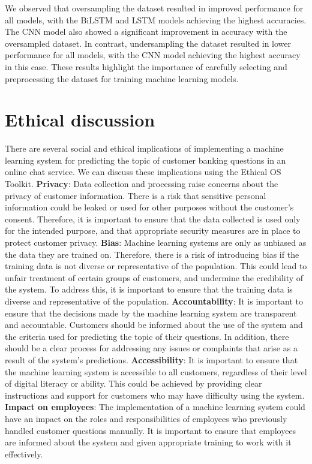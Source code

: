 \documentclass[12pt, a4paper]{article}
\begin{document}
We observed that oversampling the dataset resulted in improved performance for all models, with the BiLSTM and LSTM models achieving the highest accuracies. The CNN model also showed a significant improvement in accuracy with the oversampled dataset. In contrast, undersampling the dataset resulted in lower performance for all models, with the CNN model achieving the highest accuracy in this case. These results highlight the importance of carefully selecting and preprocessing the dataset for training machine learning models.






\section{Ethical discussion}
There are several social and ethical implications of implementing a machine learning system for predicting the topic of customer banking questions in an online chat service. We can discuss these implications using the Ethical OS Toolkit.
\newline
\textbf{Privacy}: Data collection and processing raise concerns about the privacy of customer information. There is a risk that sensitive personal information could be leaked or used for other purposes without the customer's consent. Therefore, it is important to ensure that the data collected is used only for the intended purpose, and that appropriate security measures are in place to protect customer privacy.
\newline
\textbf{Bias}: Machine learning systems are only as unbiased as the data they are trained on. Therefore, there is a risk of introducing bias if the training data is not diverse or representative of the population. This could lead to unfair treatment of certain groups of customers, and undermine the credibility of the system. To address this, it is important to ensure that the training data is diverse and representative of the population.
\newline
\textbf{Accountability}: It is important to ensure that the decisions made by the machine learning system are transparent and accountable. Customers should be informed about the use of the system and the criteria used for predicting the topic of their questions. In addition, there should be a clear process for addressing any issues or complaints that arise as a result of the system's predictions.
\newline
\textbf{Accessibility}: It is important to ensure that the machine learning system is accessible to all customers, regardless of their level of digital literacy or ability. This could be achieved by providing clear instructions and support for customers who may have difficulty using the system.
\newline
\textbf{Impact on employees}: The implementation of a machine learning system could have an impact on the roles and responsibilities of employees who previously handled customer questions manually. It is important to ensure that employees are informed about the system and given appropriate training to work with it effectively.
\end{document}
